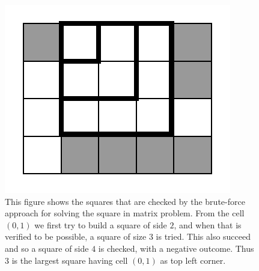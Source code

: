 \begin{figure}
	\centering
	\label{fig:square_in_matrix:squa_matrix_incremental}
	\includegraphics[width=\textwidth/2]{sources/square_in_matrix/images/squa_matrix_incremental}
	\caption[Square in matrix - Brute-force incremental square
	construction.]{This figure shows  the squares that are checked by the
	brute-force approach for solving the square in matrix problem. 
	From the cell $(0,1)$ we first try to build a square of side $2$, and when
	that is verified to be possible, a square of size $3$ is tried. This also
	succeed and so a square of side $4$ is checked, with a negative outcome.
	Thus $3$ is the largest square having cell $(0,1)$ as top left corner. }
\end{figure}

